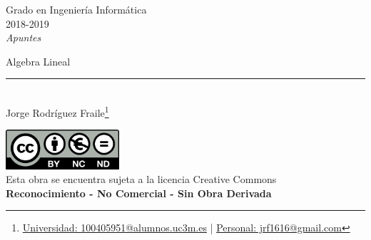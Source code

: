 \documentclass[12pt, twoside, openright]{report} %
\begin{document}
	
\begin{titlepage}
	\begin{sffamily}
	\color{azulUC3M}
	\begin{center}
		\begin{figure}[H] %
		\end{figure}
		\vspace{2.5cm}
		\begin{Large}
			Grado en Ingeniería Informática\\			
			2018-2019\\
			\vspace{2cm}		
			\textsl{Apuntes}\\
			\bigskip
		\end{Large}
		 	{\Huge Algebra Lineal}\\
		 	\vspace*{0.5cm}
	 		\rule{10.5cm}{0.1mm}\\
			\vspace*{0.9cm}
			{\LARGE Jorge Rodríguez Fraile\footnote{\href{mailto:100405951@alumnos.uc3m.es}{Universidad: 100405951@alumnos.uc3m.es}  |  \href{mailto:jrf1616@gmail.com}{Personal: jrf1616@gmail.com}}}\\ 
			\vspace*{1cm}
	\end{center}
	\vfill
	\color{black}
		\includegraphics[width=4.2cm]{img/creativecommons.png}\\
		Esta obra se encuentra sujeta a la licencia Creative Commons\\ \textbf{Reconocimiento - No Comercial - Sin Obra Derivada}
	\end{sffamily}
\end{titlepage}


\tableofcontents
\thispagestyle{fancy}
\end{document}
